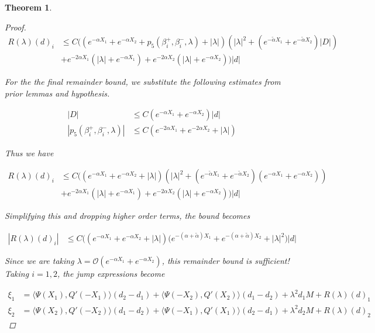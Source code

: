 \documentclass[12pt]{article}
\newtheorem{theorem}{Theorem}
\begin{document}
\begin{theorem}
\begin{proof}
\begin{align*}
R(\lambda)(d)_i &\leq C \Big( ( e^{-\alpha X_1} + e^{-\alpha X_2} + p_5(\beta_i^+, \beta_i^-, \lambda) + |\lambda|  )(|\lambda|^2 + (e^{-\tilde{\alpha}X_1} + e^{-\tilde{\alpha}X_2}) |D|) \\
&+ e^{-2 \alpha X_1}(|\lambda| + e^{-\alpha X_1}) 
+ e^{-2 \alpha X_2}(|\lambda| + e^{-\alpha X_2}) \Big) |d|
\end{align*}

For the the final remainder bound, we substitute the following estimates from prior lemmas and hypothesis.

\begin{align*}
|D| &\leq C (e^{-\alpha X_1} + e^{-\alpha X_2}) |d| \\
|p_5(\beta_i^+, \beta_i^-, \lambda)| &\leq C( e^{-2 \alpha X_1} + e^{-2 \alpha X_2} + |\lambda|)
\end{align*}

Thus we have

\begin{align*}
R(\lambda)(d)_i &\leq C \Big( ( e^{-\alpha X_1} + e^{-\alpha X_2} + |\lambda|  )(|\lambda|^2 + (e^{-\tilde{\alpha}X_1} + e^{-\tilde{\alpha}X_2}) (e^{-\alpha X_1} + e^{-\alpha X_2})) \\
&+ e^{-2 \alpha X_1}(|\lambda| + e^{-\alpha X_1}) 
+ e^{-2 \alpha X_2}(|\lambda| + e^{-\alpha X_2}) \Big) |d|
\end{align*}

Simplifying this and dropping higher order terms, the bound becomes

\begin{align*}
|R(\lambda)(d)_i| &\leq C \Big( (e^{-\alpha X_1} + e^{-\alpha X_2} + |\lambda| )(e^{-(\alpha + \tilde{\alpha})X_1} + e^{-(\alpha + \tilde{\alpha})X_2} 
+ |\lambda|^2 \Big) |d|
\end{align*}

Since we are taking $\lambda = \mathcal{O}(e^{-\alpha X_1} + e^{-\alpha X_2})$, this remainder bound is sufficient!\\

Taking $i = 1, 2$, the jump expressions become

\begin{align*}
\xi_1 &= \langle \Psi(X_1), Q'(-X_1) \rangle (d_2 - d_1 ) + \langle \Psi(-X_2), Q'(X_2) \rangle (d_1 - d_2 ) + \lambda^2 d_1 M + R(\lambda)(d)_1 \\
\xi_2 &= \langle \Psi(X_2), Q'(-X_2) \rangle (d_1 - d_2 ) + \langle \Psi(-X_1), Q'(X_1) \rangle (d_2 - d_1 ) + \lambda^2 d_2 M + R(\lambda)(d)_2
\end{align*}


\end{proof}
\end{theorem}
\end{document}

